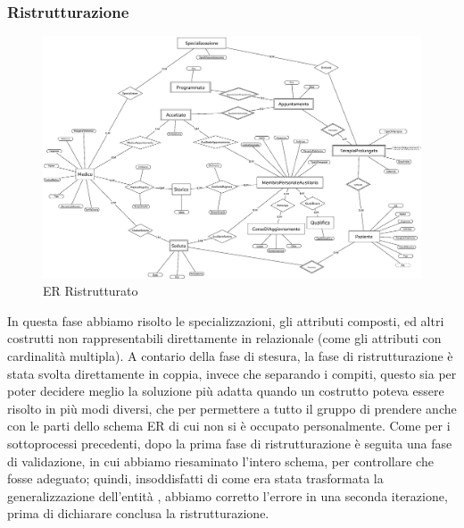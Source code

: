 \documentclass[11pt,a4paper]{article}
\begin{document}
\subsubsection{Ristrutturazione}
\begin{figure}[H]
    \includegraphics[width=\linewidth]{images/ER_Ristrutturato2.png}
    \caption{ER Ristrutturato}
    \label{fig:ER_Ristrutturato}
\end{figure}
In questa fase abbiamo risolto le specializzazioni, gli attributi composti, ed altri costrutti non rappresentabili direttamente in relazionale (come gli attributi con cardinalità multipla). A contario della fase di stesura, la fase di ristrutturazione è stata svolta direttamente in coppia, invece che separando i compiti, questo sia per poter decidere meglio la soluzione più adatta quando un costrutto poteva essere risolto in più modi diversi, che per permettere a tutto il gruppo di prendere  anche con le parti dello schema ER di cui non si è occupato personalmente.
Come per i sottoprocessi precedenti, dopo la prima fase di ristrutturazione è seguita una fase di validazione, in cui abbiamo riesaminato l'intero schema, per controllare che fosse adeguato; quindi, insoddisfatti di come era stata trasformata la generalizzazione dell'entità , abbiamo corretto l'errore in una seconda iterazione, prima di dichiarare conclusa la ristrutturazione.
\end{document}
